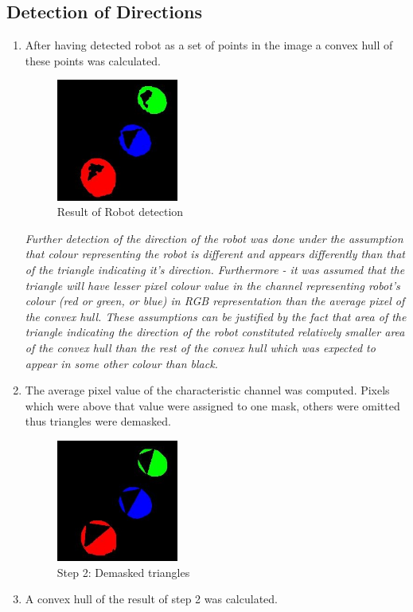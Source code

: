 \documentclass[10pt,a4paper,twocolumn]{article}
\begin{document}
\subsection{Detection of Directions}
\begin{enumerate}
\item After having detected robot as a set of points in the image a convex hull of these points was calculated.
\begin{figure}[h]
\centering
\includegraphics[width=40mm]{d1_i5_blob_mask.jpg}
 \caption{Result of Robot detection}
\end{figure} 
\textit{Further detection of the direction of the robot was done under the assumption that colour representing the robot is different and appears differently than that of the triangle indicating it's direction. Furthermore - it was assumed that the triangle will have lesser pixel colour value in the channel representing robot's colour (red or green, or blue) in RGB representation than the average pixel of the convex hull. These assumptions can be justified by the fact that area of the triangle indicating the direction of the robot constituted relatively smaller area of the convex hull than the rest of the convex hull which was expected to appear in some other colour than black. } 

\item The average pixel value of the characteristic  channel was computed. Pixels which were above that value were assigned to one mask, others were omitted thus triangles were demasked.
\begin{figure}[h]
\centering
\includegraphics[width=40mm]{d1_i5_demasked_triangles.jpg}
 \caption{Step 2: Demasked triangles}
\end{figure} 
\item A convex hull of the result of step 2 was calculated.


\end{enumerate}
\end{document}
